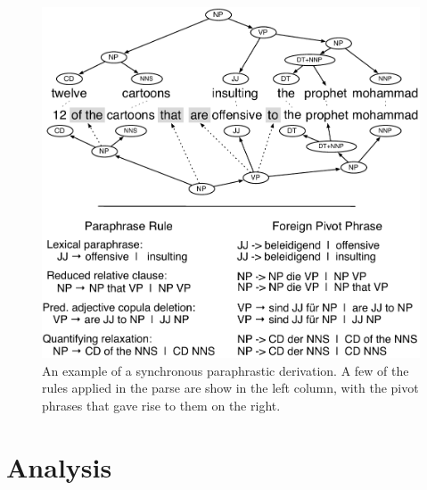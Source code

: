 \documentclass[11pt]{article}
\begin{document}
\begin{figure}[!t]
\begin{center}
\includegraphics[width=0.99\linewidth]{figures/example_compression_1col_2a.pdf}
\end{center}
\caption{An example of a synchronous paraphrastic derivation. A few of
  the rules applied in the parse are show in the left column, with the
  pivot phrases that gave rise to them on the
  right.}\label{paraphrase_derivaton}
\end{figure}

\section{Analysis} \label{analysis}
\end{document}
